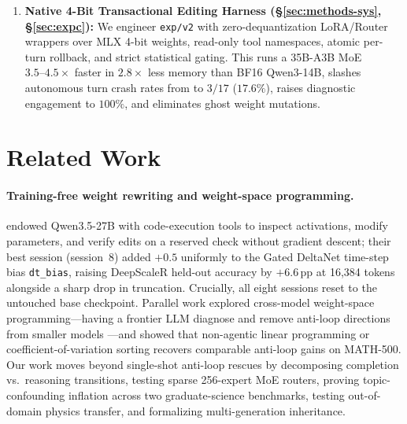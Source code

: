 \documentclass[10pt]{article}
\begin{document}
\begin{enumerate}[leftmargin=1.4em,itemsep=2pt,topsep=3pt]
    \item \textbf{Native 4-Bit Transactional Editing Harness (\S\ref{sec:methods-sys}, \S\ref{sec:expc}):} We engineer \texttt{exp/v2} with zero-dequantization LoRA/Router wrappers over MLX 4-bit weights, read-only tool namespaces, atomic per-turn rollback, and strict statistical gating. This runs a 35B-A3B MoE $3.5\text{--}4.5\times$ faster in $2.8\times$ less memory than BF16 Qwen3-14B, slashes autonomous turn crash rates from \LegacyFourteenErr{} to $3/17$ ($17.6\%$), raises diagnostic engagement to $100\%$, and eliminates ghost weight mutations.
\end{enumerate}

\section{Related Work}
\label{sec:related}

\paragraph{Training-free weight rewriting and weight-space programming.}
\citet{fan2026selfrewriting} endowed Qwen3.5-27B with code-execution tools to inspect activations, modify parameters, and verify edits on a reserved check without gradient descent; their best session (session~8) added $+0.5$ uniformly to the Gated DeltaNet time-step bias \texttt{dt\_bias}, raising DeepScaleR held-out accuracy by $+6.6$\,pp at 16,384 tokens alongside a sharp drop in truncation. Crucially, all eight sessions reset to the untouched base checkpoint. Parallel work explored cross-model weight-space programming---having a frontier LLM diagnose and remove anti-loop directions from smaller models \citep{takehi2026sparks,hu2026wsp,kundu2026samefix}---and showed that non-agentic linear programming \citep{khamis2026aha} or coefficient-of-variation sorting \citep{fischetti2026sort} recovers comparable anti-loop gains on MATH-500. Our work moves beyond single-shot anti-loop rescues by decomposing completion vs.\ reasoning transitions, testing sparse 256-expert MoE routers, proving topic-confounding inflation across two graduate-science benchmarks, testing out-of-domain physics transfer, and formalizing multi-generation inheritance.
\end{document}
